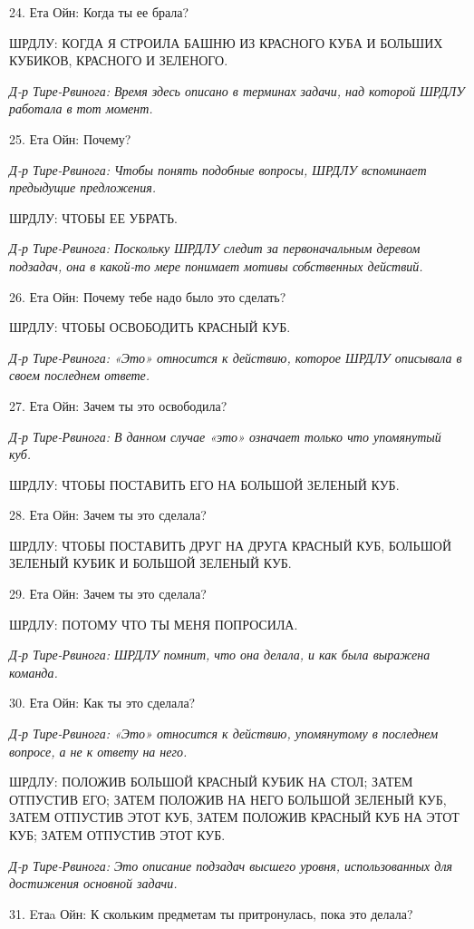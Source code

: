 \documentclass[../main.tex]{subfiles}
\begin{document}
\begin{dialogue}
24. Ета Ойн: Когда ты ее брала?

ШРДЛУ: КОГДА Я СТРОИЛА БАШНЮ ИЗ КРАСНОГО КУБА И БОЛЬШИХ КУБИКОВ, КРАСНОГО И ЗЕЛЕНОГО.

\emph{Д-р Тире-Рвинога: Время здесь описано в терминах задачи, над которой ШРДЛУ работала в тот момент.}

25. Ета Ойн: Почему?

\emph{Д-р Тире-Рвинога: Чтобы понять подобные вопросы, ШРДЛУ вспоминает предыдущие предложения.}

ШРДЛУ: ЧТОБЫ ЕЕ УБРАТЬ.

\emph{Д-р Тире-Рвинога: Поскольку ШРДЛУ следит за первоначальным деревом подзадач, она в какой-то мере понимает мотивы собственных действий.}

26. Ета Ойн: Почему тебе надо было это сделать?

ШРДЛУ: ЧТОБЫ ОСВОБОДИТЬ КРАСНЫЙ КУБ.

\emph{Д-р Тире-Рвинога: «Это» относится к действию, которое ШРДЛУ описывала в своем последнем ответе.}

27. Ета Ойн: Зачем ты это освободила?

\emph{Д-р Тире-Рвинога: В данном случае «это» означает только что упомянутый куб.}

ШРДЛУ: ЧТОБЫ ПОСТАВИТЬ ЕГО НА БОЛЬШОЙ ЗЕЛЕНЫЙ КУБ.

28. Ета Ойн: Зачем ты это сделала?

ШРДЛУ: ЧТОБЫ ПОСТАВИТЬ ДРУГ НА ДРУГА КРАСНЫЙ КУБ, БОЛЬШОЙ ЗЕЛЕНЫЙ КУБИК И БОЛЬШОЙ ЗЕЛЕНЫЙ КУБ.

29. Ета Ойн: Зачем ты это сделала?

ШРДЛУ: ПОТОМУ ЧТО ТЫ МЕНЯ ПОПРОСИЛА.

\emph{Д-р Тире-Рвинога: ШРДЛУ помнит, что она делала, и как была выражена команда.}

30. Ета Ойн: Как ты это сделала?

\emph{Д-р Тире-Рвинога: «Это» относится к действию, упомянутому в последнем вопросе, а не к ответу на него.}

ШРДЛУ: ПОЛОЖИВ БОЛЬШОЙ КРАСНЫЙ КУБИК НА СТОЛ; ЗАТЕМ ОТПУСТИВ ЕГО; ЗАТЕМ ПОЛОЖИВ НА НЕГО БОЛЬШОЙ ЗЕЛЕНЫЙ КУБ, ЗАТЕМ ОТПУСТИВ ЭТОТ КУБ, ЗАТЕМ ПОЛОЖИВ КРАСНЫЙ КУБ НА ЭТОТ КУБ; ЗАТЕМ ОТПУСТИВ ЭТОТ КУБ.

\emph{Д-р Тире-Рвинога: Это описание подзадач высшего уровня, использованных для достижения основной задачи.}

31. Eтаa Ойн: К скольким предметам ты притронулась, пока это делала?


\end{dialogue}
\end{document}
